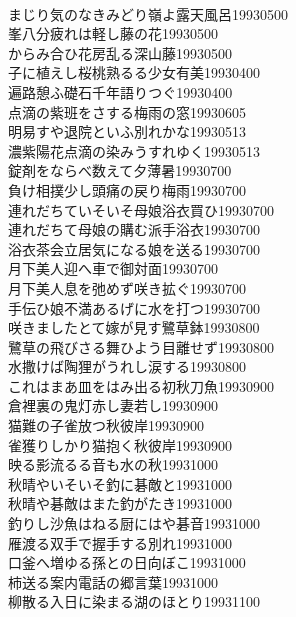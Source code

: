 \begin{multicols}{2}
\\まじり気のなきみどり嶺よ露天風呂\hfill{19930500}
\\峯八分疲れは軽し藤の花\hfill{19930500}
\\からみ合ひ花房乱る深山藤\hfill{19930500}
\\子に植えし桜桃熟るる少女有美\hfill{19930400}
\\遍路憩ふ礎石千年語りつぐ\hfill{19930400}
\\点滴の紫班をさする梅雨の窓\hfill{19930605}
\\明易すや退院といふ別れかな\hfill{19930513}
\\濃紫陽花点滴の染みうすれゆく\hfill{19930513}
\\錠剤をならべ数えて夕薄暑\hfill{19930700}
\\負け相撲少し頭痛の戻り梅雨\hfill{19930700}
\\連れだちていそいそ母娘浴衣買ひ\hfill{19930700}
\\連れだちて母娘の購む派手浴衣\hfill{19930700}
\\浴衣茶会立居気になる娘を送る\hfill{19930700}
\\月下美人迎へ車で御対面\hfill{19930700}
\\月下美人息を弛めず咲き拡ぐ\hfill{19930700}
\\手伝ひ娘不満あるげに水を打つ\hfill{19930700}
\\咲きましたとて嫁が見す鷺草鉢\hfill{19930800}
\\鷺草の飛びさる舞ひよう目離せず\hfill{19930800}
\\水撒けば陶狸がうれし涙する\hfill{19930800}
\\これはまあ皿をはみ出る初秋刀魚\hfill{19930900}
\\倉裡裏の鬼灯赤し妻若し\hfill{19930900}
\\猫難の子雀放つ秋彼岸\hfill{19930900}
\\雀獲りしかり猫抱く秋彼岸\hfill{19930900}
\\映る影流るる音も水の秋\hfill{19931000}
\\秋晴やいそいそ釣に碁敵と\hfill{19931000}
\\秋晴や碁敵はまた釣がたき\hfill{19931000}
\\釣りし沙魚はねる厨にはや碁音\hfill{19931000}
\\雁渡る双手で握手する別れ\hfill{19931000}
\\口釜へ増ゆる孫との日向ぼこ\hfill{19931000}
\\柿送る案内電話の郷言葉\hfill{19931000}
\\柳散る入日に染まる湖のほとり\hfill{19931100}

\end{multicols}
